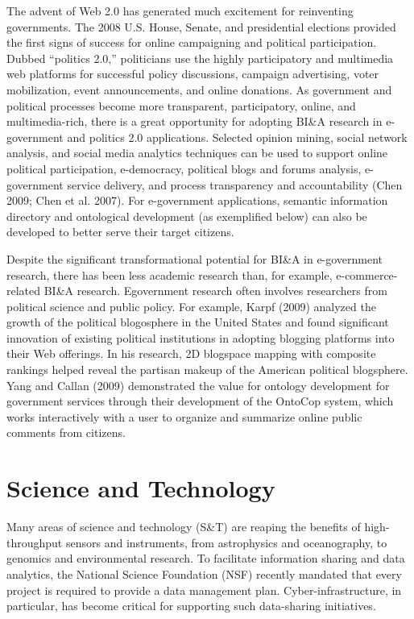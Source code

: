 The advent of Web 2.0 has generated much excitement for
reinventing governments. The 2008 U.S. House, Senate, and
presidential elections provided the first signs of success for
online campaigning and political participation. Dubbed
“politics 2.0,” politicians use the highly participatory and
multimedia web platforms for successful policy discussions,
campaign advertising, voter mobilization, event announcements,
and online donations. As government and political
processes become more transparent, participatory, online, and
multimedia-rich, there is a great opportunity for adopting
BI\&A research in e-government and politics 2.0 applications.
Selected opinion mining, social network analysis, and social
media analytics techniques can be used to support online
political participation, e-democracy, political blogs and
forums analysis, e-government service delivery, and process
transparency and accountability (Chen 2009; Chen et al.
2007). For e-government applications, semantic information
directory and ontological development (as exemplified below)
can also be developed to better serve their target citizens.

Despite the significant transformational potential for BI\&A in
e-government research, there has been less academic research
than, for example, e-commerce-related BI\&A research. Egovernment
research often involves researchers from political
science and public policy. For example, Karpf (2009) analyzed
the growth of the political blogosphere in the United
States and found significant innovation of existing political
institutions in adopting blogging platforms into their Web
offerings. In his research, 2D blogspace mapping with composite
rankings helped reveal the partisan makeup of the
American political blogsphere. Yang and Callan (2009)
demonstrated the value for ontology development for government
services through their development of the OntoCop
system, which works interactively with a user to organize and
summarize online public comments from citizens.

\section*{Science and Technology}

Many areas of science and technology (S\&T) are reaping the
benefits of high-throughput sensors and instruments, from
astrophysics and oceanography, to genomics and environmental
research. To facilitate information sharing and data
analytics, the National Science Foundation (NSF) recently
mandated that every project is required to provide a data
management plan. Cyber-infrastructure, in particular, has
become critical for supporting such data-sharing initiatives.


